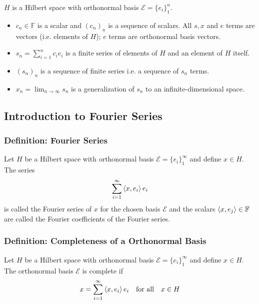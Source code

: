 \documentclass[11pt, a4paper]{article}
\newcommand{\F}{\mathbb{F}} %
\begin{document}
$ H $ is a Hilbert space with orthonormal basis $ \mathcal{E} = \big \{ e_i \big \}_{1}^{n} $. 
\begin{itemize}
\item $ c_n \in \F $ is a scalar and $ (c_n)_n $ is a sequence of scalars. All $ s, x $ and $ e $ terms are vectors (i.e. elements of $ H $); $ e $ terms are orthonormal basis vectors.

\item $ s_n = \sum_{i = 1}^{n} c_i e_i $ is a finite series of elements of $ H $ and an element of $ H $ itself.

\item $ (s_n)_n $ is a sequence of finite series i.e. a sequence of $ s_n $ terms.

\item $ x_n = \lim_{n \to \infty} s_n $ is a generalization of $ s_n $ to an infinite-dimensional space.


\end{itemize}

\subsection{Introduction to Fourier Series}

\subsubsection{Definition: Fourier Series}
Let $ H $ be a Hilbert space with orthonormal basis $ \mathcal{E} = \big \{ e_i \big \}_{1}^{\infty}$ and define $ x \in H $. The series
\begin{equation*}
	\sum_{i = 1}^{\infty} \expval{x, e_i}e_i
\end{equation*}
is called the Fourier series of $ x $ for the chosen basis $ \mathcal{E} $ and the scalars $ \expval{x, e_j} \in \F $ are called the Fourier coefficients of the Fourier series.

\subsubsection{Definition: Completeness of a Orthonormal Basis}
Let $ H $ be a Hilbert space with orthonormal basis $ \mathcal{E} = \big \{ e_i \big \}_{1}^{\infty}$ and define $ x \in H $. The orthonormal basis $ \mathcal{E} $ is complete if 
\begin{equation*}
	x = \sum_{i = 1}^{\infty} \expval{x, e_i}e_i \quad \text{for all} \quad x \in H
\end{equation*}
\end{document}
